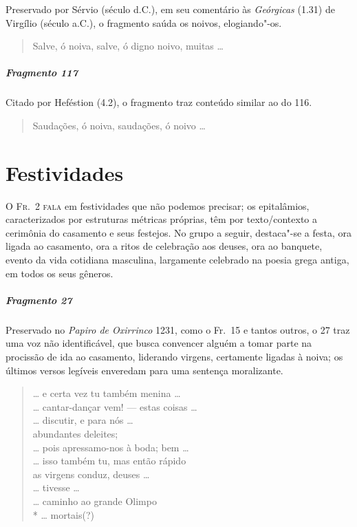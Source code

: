 {\small Preservado por Sérvio (século  d.C.), em seu comentário às \textit{Geórgicas} (1.31) de Virgílio (século  a.C.), o fragmento saúda os noivos, elogiando"-os.}

\begin{verse}
Salve, ó noiva, salve, ó digno noivo, muitas \ldots{}
\end{verse}

\paragraph{Fragmento 117}

{\small Citado por Heféstion (4.2), o fragmento traz conteúdo similar ao do 116.}

\begin{verse}
Saudações, ó noiva, saudações, ó noivo \ldots{}
\end{verse}

\chapter{Festividades}

\textsc{O Fr.~2 fala} em festividades que não podemos precisar; os epitalâmios,
caracterizados por estruturas métricas próprias, têm por texto/contexto a
cerimônia do casamento e seus festejos. No grupo a seguir, destaca"-se a festa,
ora ligada ao casamento, ora a ritos de celebração aos deuses, ora ao banquete,
evento da vida cotidiana masculina, largamente celebrado na poesia grega
antiga, em todos os seus gêneros.

\paragraph{Fragmento 27}

{\small Preservado no \textit{Papiro de Oxirrinco} 1231, como o Fr.~15 e tantos outros, o 27 traz uma
voz não identificável, que busca convencer alguém a tomar parte na procissão de
ida ao casamento, liderando virgens, certamente ligadas à noiva; os últimos versos
legíveis enveredam para uma sentença moralizante.}

\begin{verse}
\ldots{} e certa vez tu também menina \ldots{}\\
\ldots{} cantar-dançar vem! --- estas coisas \ldots{}\\
\ldots{} discutir, e para nós \ldots{}\\
abundantes deleites;\\
\ldots{} pois apressamo-nos à boda; bem \ldots{}\\
\ldots{} isso também tu, mas então rápido\\
as virgens conduz, deuses \ldots{}\\
\ldots{} tivesse \ldots{}\\
\ldots{} caminho ao grande Olimpo\\*
\ldots{} mortais(?)
\end{verse}

